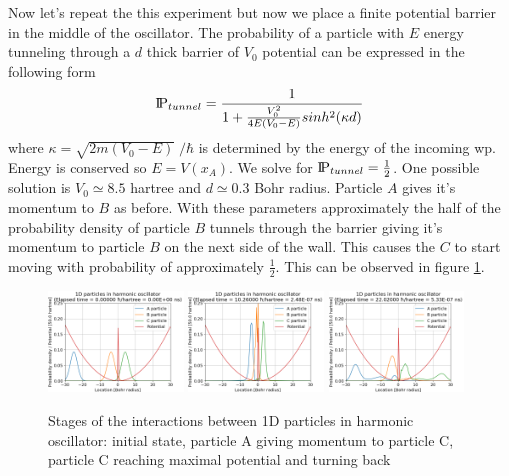 Now let's repeat the this experiment but now we place a finite potential barrier in the middle of the oscillator.
The probability of a particle with $E$ energy tunneling through a $d$ thick barrier of $V_0$ potential can be expressed in the following form
\begin{equation}
	\label{eq:tunelling probability}
	\text{I\kern-0.15em P}_{tunnel} = \frac{1}{1 + \frac{V_0^2}{4E(V_0 - E)}sinh^2(\kappa d)}
\end{equation}
where $\kappa = \sqrt{2m(V_0 - E)}\;/\hbar$ is determined by the energy of the incoming \acrshort{wp}.
Energy is conserved so $E = V(x_A)$.
We solve for $\text{I\kern-0.15em P}_{tunnel} = \frac{1}{2}$.
One possible solution is $V_0 \simeq 8.5$ hartree and $d \simeq 0.3$ Bohr radius.
Particle $A$ gives it's momentum to $B$ as before.
With these parameters approximately the half of the probability density of particle $B$ tunnels through the barrier giving it's momentum to particle $B$ on the next side of the wall.
This causes the $C$ to start moving with probability of approximately $\frac{1}{2}$.
This can be observed in figure \ref{fig:1d_osc_with_tunneling}.
\begin{figure}
	\begin{center}
		\includegraphics[width=0.32\textwidth]{figures/1d_oscillator_tunneling_01.png}
		\includegraphics[width=0.32\textwidth]{figures/1d_oscillator_tunneling_02.png}
		\includegraphics[width=0.32\textwidth]{figures/1d_oscillator_tunneling_03.png}
		\caption{Stages of the interactions between 1D particles in harmonic oscillator: initial state, particle A giving momentum to particle C, particle C reaching maximal potential and turning back}
		\label{fig:1d_osc_with_tunneling}
	\end{center}	
\end{figure}

